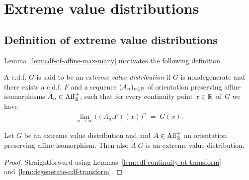 %

\chapter{Extreme value distributions}

\section{Definition of extreme value distributions}

Lemma~\ref{lem:cdf-of-affine-max-many} motivates the following definition.

\begin{definition}
  \label{def:extr-val-distr}
  A c.d.f. $G$ is said to be an \emph{extreme value distribution} if
  $G$ is nondegenerate and
  there exists a c.d.f. $F$ and a sequence $(A_n)_{n \in \mathbb{N}}$ of orientation
  preserving affine isomorphisms $A_n \in \mathrm{Aff}^+_{\mathbb{R}}$, such that
  for every continuity point $x \in \mathbb{R}$ of~$G$ we have
  \begin{align*}
  \lim_{n \to \infty} \big( (A_n.F)(x) \big)^n \; = \; G(x) .
  \end{align*}
\end{definition}

\begin{lemma}
  \label{lem:extr-val-distr-transform}
  \leanok
  Let $G$ be an extreme value distribution and
  and $A \in \mathrm{Aff}^+_{\mathbb{R}}$ an orientation preserving affine isomorphism.
  Then also $A.G$ is an extreme value distribution.
\end{lemma}
\begin{proof}
  Straightforward using Lemmas~\ref{lem:cdf-continuity-pt-transform}
  and~\ref{lem:degenerate-cdf-transform}.
\end{proof}



